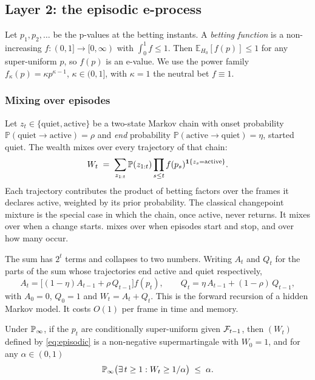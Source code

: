\subsection{Layer 2: the episodic e-process}
\label{sec:episodic}

Let $p_1, p_2, \ldots$ be the p-values at the betting instants. A \emph{betting function} is a non-increasing $f : (0,1] \to [0,\infty)$ with $\int_0^1 f \le 1$. Then $\mathbb{E}_{H_0}[f(p)] \le 1$ for any super-uniform $p$, so $f(p)$ is an e-value. We use the power family $f_\kappa(p) = \kappa p^{\kappa-1}$, $\kappa \in (0,1]$, with $\kappa = 1$ the neutral bet $f \equiv 1$.

\subsubsection{Mixing over episodes}

Let $z_t \in \{\text{quiet}, \text{active}\}$ be a two-state Markov chain with onset probability $\mathbb{P}(\text{quiet} \to \text{active}) = \rho$ and \emph{end} probability $\mathbb{P}(\text{active} \to \text{quiet}) = \eta$, started quiet. The wealth mixes over every trajectory of that chain:
\begin{equation}
\label{eq:episodic}
  W_t \;=\; \sum_{z_{1:t}} \mathbb{P}(z_{1:t})
            \prod_{s \le t} f(p_s)^{\mathbf{1}\{z_s = \text{active}\}} .
\end{equation}
Each trajectory contributes the product of betting factors over the frames it declares active, weighted by its prior probability. The classical changepoint mixture is the special case in which the chain, once active, never returns. It mixes over when a change starts.  mixes over when episodes start and stop, and over how many occur.

The sum has $2^t$ terms and collapses to two numbers. Writing $A_t$ and $Q_t$ for the parts of the sum whose trajectories end active and quiet respectively,
\begin{equation}
\label{eq:forward}
  A_t = \bigl[(1-\eta)A_{t-1} + \rho\,Q_{t-1}\bigr] f(p_t),
  \qquad
  Q_t = \eta\,A_{t-1} + (1-\rho)\,Q_{t-1},
\end{equation}
with $A_0 = 0$, $Q_0 = 1$ and $W_t = A_t + Q_t$. This is the forward recursion of a hidden Markov model. It costs $O(1)$ per frame in time and memory.

\begin{theorem}
\label{thm:episodic}
Under $\mathbb{P}_{\infty}$, if the $p_t$ are conditionally super-uniform given
$\mathcal{F}_{t-1}$, then $(W_t)$ defined by \cref{eq:episodic} is a non-negative
supermartingale with $W_0 = 1$, and for any $\alpha \in (0,1)$
\begin{equation*}
  \mathbb{P}_{\infty}\bigl(\exists\, t \ge 1 : W_t \ge 1/\alpha\bigr) \;\le\; \alpha .
\end{equation*}
\end{theorem}

